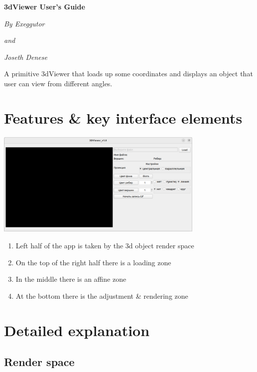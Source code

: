 \documentclass{article}
\begin{document}
\begin{center}
    \Large
    \textbf{3dViewer User's Guide}

    \vspace{0.5cm}

    \textit{By Exeggutor}

    \textit{and}

    \textit{Joseth Denese}

    \vspace{0.5cm}

    A primitive 3dViewer that loads up some coordinates and displays an object that user can view from different angles.
\end{center}

\pagebreak

\section{Features \& key interface elements}

\includegraphics[width=10cm, keepaspectratio]{3dv_1}

\begin{enumerate}
    \item Left half of the app is taken by the 3d object render space
    \item On the top of the right half there is a loading zone
    \item In the middle there is an affine zone
    \item At the bottom there is the adjustment \& rendering zone
\end{enumerate}

\pagebreak

\section{Detailed explanation}
\subsection{Render space}
\end{document}

